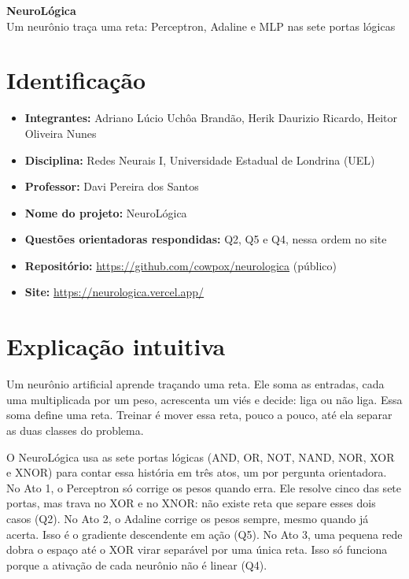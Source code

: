 \documentclass[11pt]{article}
\begin{document}
\begin{center}
    \Large\textbf{NeuroLógica}\\[2pt]
    \large Um neurônio traça uma reta: Perceptron, Adaline e MLP nas sete portas lógicas
\end{center}

\smallskip

\section*{Identificação}

\begin{itemize}
    \item \textbf{Integrantes:} Adriano Lúcio Uchôa Brandão, Herik Daurizio Ricardo, Heitor Oliveira Nunes
    \item \textbf{Disciplina:} Redes Neurais I, Universidade Estadual de Londrina (UEL)
    \item \textbf{Professor:} Davi Pereira dos Santos
    \item \textbf{Nome do projeto:} NeuroLógica
    \item \textbf{Questões orientadoras respondidas:} Q2, Q5 e Q4, nessa ordem no site
    \item \textbf{Repositório:} \url{https://github.com/cowpox/neurologica} (público)
    \item \textbf{Site:} \url{https://neurologica.vercel.app/}
\end{itemize}

\section{Explicação intuitiva}

Um neurônio artificial aprende traçando uma reta. Ele soma as entradas, cada uma
multiplicada por um peso, acrescenta um viés e decide: liga ou não liga. Essa soma define uma
reta. Treinar é mover essa reta, pouco a pouco, até ela separar as duas classes do problema.

O NeuroLógica usa as sete portas lógicas (AND, OR, NOT, NAND, NOR, XOR e XNOR) para contar
essa história em três atos, um por pergunta orientadora. No Ato 1, o Perceptron só corrige os
pesos quando erra. Ele resolve cinco das sete portas, mas trava no XOR e no XNOR: não existe
reta que separe esses dois casos (Q2). No Ato 2, o Adaline corrige os pesos sempre, mesmo
quando já acerta. Isso é o gradiente descendente em ação (Q5). No Ato 3, uma pequena rede
dobra o espaço até o XOR virar separável por uma única reta. Isso só funciona porque a
ativação de cada neurônio não é linear (Q4).
\end{document}
